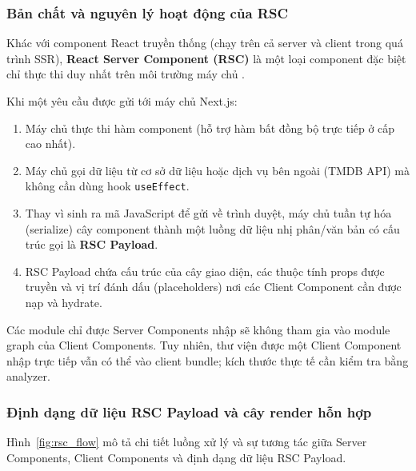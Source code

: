 \documentclass[12pt,a4paper]{extarticle}
\begin{document}
\subsubsection{Bản chất và nguyên lý hoạt động của RSC}
Khác với component React truyền thống (chạy trên cả server và client trong quá trình SSR), \textbf{React Server Component (RSC)} là một loại component đặc biệt chỉ thực thi duy nhất trên môi trường máy chủ \cite{rsc_architecture}. 

Khi một yêu cầu được gửi tới máy chủ Next.js:
\begin{enumerate}[noitemsep]
    \item Máy chủ thực thi hàm component (hỗ trợ hàm bất đồng bộ  trực tiếp ở cấp cao nhất).
    \item Máy chủ gọi dữ liệu từ cơ sở dữ liệu hoặc dịch vụ bên ngoài (TMDB API) mà không cần dùng hook \texttt{useEffect}.
    \item Thay vì sinh ra mã JavaScript để gửi về trình duyệt, máy chủ tuần tự hóa (serialize) cây component thành một luồng dữ liệu nhị phân/văn bản có cấu trúc gọi là \textbf{RSC Payload}.
    \item RSC Payload chứa cấu trúc của cây giao diện, các thuộc tính props được truyền và vị trí đánh dấu (placeholders) nơi các Client Component cần được nạp và hydrate.
\end{enumerate}

Các module chỉ được Server Components nhập sẽ không tham gia vào module graph của Client Components. Tuy nhiên, thư viện được một Client Component nhập trực tiếp vẫn có thể vào client bundle; kích thước thực tế cần kiểm tra bằng analyzer.

\subsubsection{Định dạng dữ liệu RSC Payload và cây render hỗn hợp}
Hình~\ref{fig:rsc_flow} mô tả chi tiết luồng xử lý và sự tương tác giữa Server Components, Client Components và định dạng dữ liệu RSC Payload.
\end{document}
